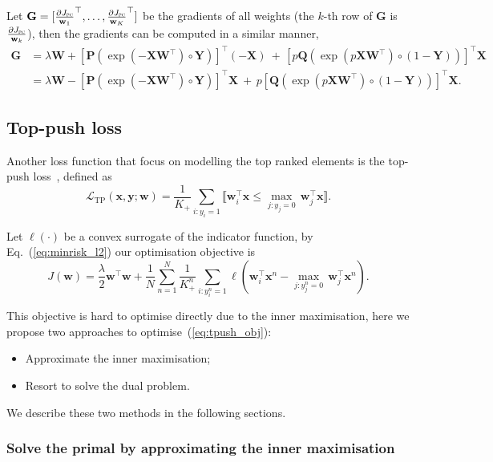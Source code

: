 \documentclass[9pt]{extarticle}
\newcommand{\llb}{\llbracket}
\newcommand{\rrb}{\rrbracket}
\newcommand{\x}{\mathbf{x}}
\newcommand{\y}{\mathbf{y}}
\newcommand{\1}{\mathbf{1}}
\newcommand{\w}{\mathbf{w}}
\newcommand{\G}{\mathbf{G}}
\newcommand{\Pb}{\mathbf{P}}
\newcommand{\Q}{\mathbf{Q}}
\newcommand{\W}{\mathbf{W}}
\newcommand{\X}{\mathbf{X}}
\newcommand{\Y}{\mathbf{Y}}
\newcommand{\LCal}{\mathcal{L}}
\begin{document}
Let $\G=[\frac{\partial J_\textsc{pc}}{\w_1}^\top,\dots,\frac{\partial J_\textsc{pc}}{\w_K}^\top]$ be the gradients of all weights
(the $k$-th row of $\G$ is $\frac{\partial J_\textsc{pc}}{\w_k}$),
then the gradients can be computed in a similar manner,
\begin{align*}
\G 
&= \lambda \W + 
   \left[ \Pb \left( \exp(-\X \W^\top) \circ \Y     \right) \right]^\top \! (-\X) \ + \,
   \left[ p\Q \left( \exp(p\X \W^\top) \circ (1-\Y) \right) \right]^\top \! \X \\
&= \lambda \W -
   \left[ \Pb \left( \exp(-\X \W^\top) \circ \Y     \right) \right]^\top \! \X \ + \,
   p \left[\Q \left( \exp(p\X \W^\top) \circ (1-\Y) \right) \right]^\top \! \X.
\end{align*}




\subsection{Top-push loss}
\label{ssec:tpush}

Another loss function that focus on modelling the top ranked elements is the top-push loss~\cite{li2014top}, defined as
\begin{equation}
\label{eq:tpush_loss}
\LCal_\text{TP}(\x, \y; \w) = \frac{1}{K_+} \sum_{i:y_i=1} \llb \w_i^\top \x \le \underset{j:y_j=0}{\max} \, \w_j^\top \x \rrb.
\end{equation}

Let $\ell(\cdot)$ be a convex surrogate of the indicator function, by Eq.~(\ref{eq:minrisk_l2}) our optimisation objective is
\begin{equation}
\label{eq:tpush_obj}
J(\w) = \frac{\lambda}{2} \w^\top \w + \frac{1}{N} \sum_{n=1}^N 
        \frac{1}{K_+^n} \sum_{i:y_i^n=1} \ell \left( \w_i^\top \x^n - \underset{j:y_j^n=0}{\max} \, \w_j^\top \x^n \right).
\end{equation}

This objective is hard to optimise directly due to the inner maximisation,
here we propose two approaches to optimise~(\ref{eq:tpush_obj}):
\begin{itemize}
\item Approximate the inner maximisation;
\item Resort to solve the dual problem.
\end{itemize}
We describe these two methods in the following sections.

\subsubsection{Solve the primal by approximating the inner maximisation}
\label{sssec:tp_primal}
\end{document}
